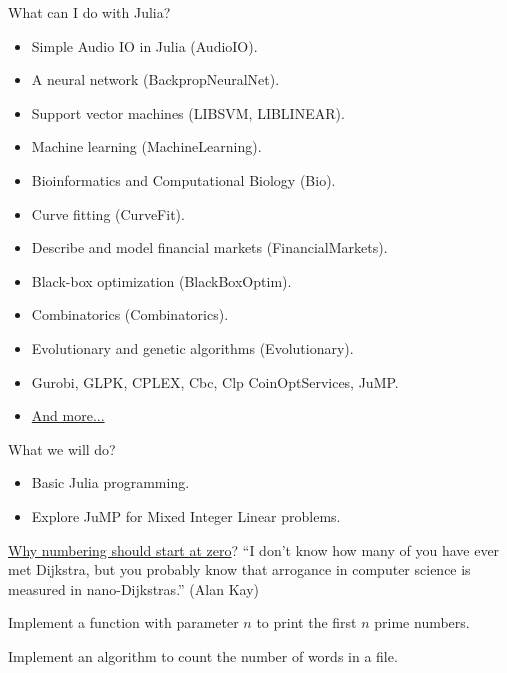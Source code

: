 \documentclass{beamer}
\begin{document}
\begin{frame}{What can I do with Julia?}
  \begin{itemize}\footnotesize
  \item[] Simple Audio IO in Julia (AudioIO).
  \item[] A neural network (BackpropNeuralNet).
  \item[] Support vector machines (LIBSVM, LIBLINEAR).
  \item[] Machine learning (MachineLearning).
  \item[] Bioinformatics and Computational Biology (Bio).
  \item[] Curve fitting (CurveFit).
  \item[] Describe and model financial markets (FinancialMarkets).
  \item[] Black-box optimization (BlackBoxOptim).
  \item[] Combinatorics (Combinatorics).
  \item[] Evolutionary and genetic algorithms (Evolutionary).
  \item[] Gurobi, GLPK, CPLEX, Cbc, Clp CoinOptServices, JuMP.
  \item[] \href{http://pkg.julialang.org/}{And more...}
  \end{itemize}
\end{frame}

\begin{frame}{What we will do?}
  \begin{itemize}
  \item[] Basic Julia programming.
  \item[] Explore JuMP for Mixed Integer Linear problems.
  \end{itemize}
\end{frame}

\begin{frame}
  \href{https://www.cs.utexas.edu/users/EWD/transcriptions/EWD08xx/EWD831.html}{Why numbering should start at zero}?
  \pause
  ``I don't know how many of you have ever met Dijkstra, but you probably know that arrogance in computer science is measured in nano-Dijkstras.'' (Alan Kay)
\end{frame}

\begin{frame}
  Implement a function with parameter $n$ to print the first $n$ prime numbers. 
\end{frame}

\begin{frame}
  Implement an algorithm to count the number of words in a file.
\end{frame}
\end{document}

